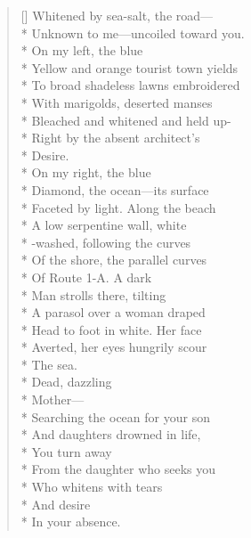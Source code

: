 \label{ch:death_in_july}
\settowidth{\versewidth}{Unknown to me---uncoiled toward you.}
\begin{verse}[\versewidth]
Whitened by sea-salt, the road---\\*
Unknown to me---uncoiled toward you.\\*
On my left, the blue\\*
Yellow and orange tourist town yields\\*
To broad shadeless lawns embroidered\\*
With marigolds, deserted manses\\*
Bleached and whitened and held up-\\*
Right by the absent architect's\\*
Desire.\\*
 \qquad On my right, the blue\\*
Diamond, the ocean---its surface\\*
Faceted by light.   Along the beach\\*
A low serpentine wall, white\\*
-washed, following the curves\\*
Of the shore, the parallel curves\\*
Of Route 1-A.   A dark\\*
Man strolls there, tilting\\*
A parasol over a woman draped\\*
Head to foot in white.   Her face\\*
Averted, her eyes hungrily scour\\*
The sea.\\*
 \qquad Dead, dazzling\\*
 \qquad  \qquad  \qquad  \qquad Mother---\\*
Searching the ocean for your son\\*
And daughters drowned in life,\\*
 \qquad  \qquad  \qquad  \qquad You turn away\\*
From the daughter who seeks you\\*
Who whitens with tears\\*
 \qquad  \qquad  \qquad And desire\\*
In your absence.
\end{verse}
